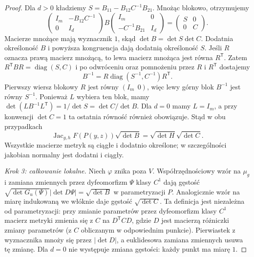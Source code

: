 \begin{proof}
Dla $d>0$ kładziemy $S=B_{11}-B_{12}C^{-1}B_{21}$.
Mnożąc blokowo, otrzymujemy
\[
 \begin{pmatrix}I_m&-B_{12}C^{-1}\\0&I_d\end{pmatrix}
 B
 \begin{pmatrix}I_m&0\\-C^{-1}B_{21}&I_d\end{pmatrix}
 =\begin{pmatrix}S&0\\0&C\end{pmatrix}.
\]
Macierze mnożące mają wyznacznik $1$, skąd
$\det B=\det S\det C$. Dodatnia określoność $B$
i powyższa kongruencja dają dodatnią określoność $S$.
Jeśli $R$ oznacza prawą macierz mnożącą,
to lewa macierz mnożąca jest równa $R^{\mathsf T}$.
Zatem $R^{\mathsf T}BR=\operatorname{diag}(S,C)$
i po odwróceniu oraz pomnożeniu przez $R$ i
$R^{\mathsf T}$ dostajemy
\[
 B^{-1}=R\operatorname{diag}(S^{-1},C^{-1})R^{\mathsf T}.
\]
Pierwszy wiersz blokowy $R$ jest równy $(I_m\ \ 0)$,
więc lewy górny blok $B^{-1}$ jest równy $S^{-1}$. Ponieważ $L$ wybiera
ten blok, mamy $\det(LB^{-1}L^{\mathsf T})=
1/\det S=\det C/\det B$.
Dla $d=0$ mamy $L=I_m$, a przy konwencji $\det C=1$
ta ostatnia równość również obowiązuje. Stąd w obu przypadkach
\[
 \operatorname{Jac}_{g,h}F(P(y,z))\sqrt{\det B}
 =\sqrt{\det H}\sqrt{\det C}.
\]
Wszystkie macierze metryk są ciągłe i dodatnio określone;
w szczególności jakobian normalny jest dodatni i ciągły.

\emph{Krok 3: całkowanie lokalne.}
Niech $\varphi$ znika poza $V$. Współrzędnościowy wzór
na $\mu_g$ i zamiana zmiennych przez dyfeomorfizm
$\Psi$ klasy $C^1$ dają gęstość
$\sqrt{\det G_u(\Psi)}|\det D\Psi|=\sqrt{\det B}$
w parametryzacji $P$. Analogicznie wzór na miarę
indukowaną we włóknie daje gęstość $\sqrt{\det C}$.
Ta definicja jest niezależna od parametryzacji:
przy zmianie parametrów przez dyfeomorfizm klasy $C^1$
macierz metryki zmienia się z $C$ na $D^{\mathsf T}CD$,
gdzie $D$ jest macierzą różniczki zmiany parametrów
(z $C$ obliczanym w odpowiednim punkcie).
Pierwiastek z wyznacznika mnoży się przez $|\det D|$,
a euklidesowa zamiana zmiennych usuwa tę zmianę.
Dla $d=0$ nie występuje zmiana gęstości: każdy punkt
ma miarę $1$.


\end{proof}
